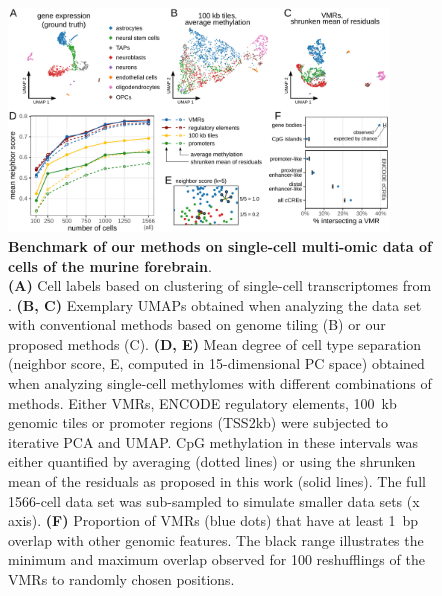 \documentclass[10pt]{article}
\begin{document}
\begin{figure}[p]
	\begin{center}
		\includegraphics[width=0.9\textwidth]{figures/Fig_benchmark.pdf}
	\end{center}
	\caption{\small \textbf{Benchmark of our methods on single-cell multi-omic data of cells of the murine forebrain}.\\
		\textbf{(A)} Cell labels based on clustering of single-cell transcriptomes from \citet{kremer_scnmt}.
		\textbf{(B, C)} Exemplary UMAPs obtained when analyzing the data set with conventional methods based on genome tiling (B) or our proposed methods (C).
		\textbf{(D, E)} Mean degree of cell type separation (neighbor score, E, computed in 15-dimensional PC space) obtained when analyzing single-cell methylomes with different combinations of methods.
		Either VMRs, ENCODE regulatory elements, 100~kb genomic tiles or promoter regions (TSS\textpm2kb) were subjected to iterative PCA and UMAP.
		CpG methylation in these intervals was either quantified by averaging (dotted lines) or using the shrunken mean of the residuals as proposed in this work (solid lines).
		The full 1566-cell data set was sub-sampled to simulate smaller data sets (x axis).
		\textbf{(F)} Proportion of VMRs (blue dots) that have at least 1~bp overlap with other genomic features.
		The black range illustrates the minimum and maximum overlap observed for 100 reshufflings of the VMRs to randomly chosen positions.
	}
	\label{fig:score}
\end{figure}
\end{document}
